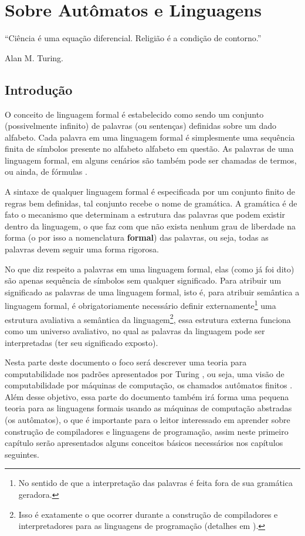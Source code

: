 \chapter{Sobre Autômatos e Linguagens}\label{cap:IntroFLA}

\epigraph{``Ciência é uma equação diferencial. Religião é a condição de contorno.''}{Alan M. Turing.}

\section{Introdução}\label{sec:IntroComputabilite}

O conceito de linguagem formal é estabelecido como sendo um conjunto (possivelmente infinito) de palavras (ou sentenças) definidas sobre um dado alfabeto. Cada palavra em uma linguagem formal é simplesmente uma sequência finita de símbolos presente no alfabeto alfabeto em questão. As palavras de uma linguagem formal, em alguns cenários são também pode ser chamadas de termos, ou ainda, de fórmulas \cite{joaoPavao2014}.

A sintaxe de qualquer linguagem formal é especificada por um conjunto finito de regras bem definidas, tal conjunto recebe o nome de gramática. A gramática é de fato o mecanismo que determinam a estrutura das palavras que podem existir dentro da linguagem, o que faz com que não exista nenhum grau de liberdade na forma (o por isso a nomenclatura \textbf{formal}) das palavras\cite{benja-Logica}, ou seja, todas as palavras devem seguir uma forma rigorosa. 

No que diz respeito a palavras em uma linguagem formal, elas (como já foi dito) são apenas sequência de símbolos sem qualquer significado. Para atribuir um significado as palavras de uma linguagem formal, isto é, para atribuir semântica a linguagem formal, é obrigatoriamente necessário definir externamente\footnote{No sentido de que a interpretação das palavras é feita fora de sua gramática geradora.} uma estrutura avaliativa a semântica da linguagem\footnote{Isso é exatamente o que ocorrer durante a construção de compiladores e interpretadores para as linguagens de programação (detalhes em \cite{aho2007, cooper2017}).}, essa estrutura externa funciona como um universo avaliativo, no qual as palavras da linguagem pode ser interpretadas (ter seu significado exposto).

Nesta parte deste documento o foco será descrever uma teoria para computabilidade nos padrões apresentados por Turing \cite{turing1937}, ou seja, uma visão de computabilidade por máquinas de computação, os chamados autômatos finitos \cite{aho2007,hopcroft2008}. Além desse objetivo, essa parte do documento também irá forma uma pequena teoria para as linguagens formais usando as máquinas de computação abstradas (os autômatos), o que é importante para o leitor interessado em aprender sobre construção de compiladores e linguagens de programação, assim neste primeiro capítulo serão apresentados alguns conceitos básicos necessários nos capítulos seguintes.

